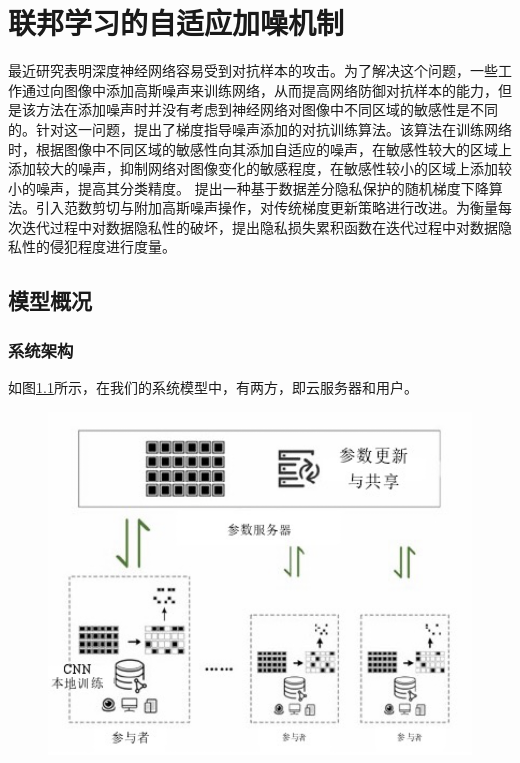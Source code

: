 \chapter{联邦学习的自适应加噪机制}
\label{ch3}

最近研究表明深度神经网络容易受到对抗样本的攻击。为了解决这个问题，一些工作通过向图像中添加高斯噪声来训练网络，从而提高网络防御对抗样本的能力，但是该方法在添加噪声时并没有考虑到神经网络对图像中不同区域的敏感性是不同的。针对这一问题，提出了梯度指导噪声添加的对抗训练算法。该算法在训练网络时，根据图像中不同区域的敏感性向其添加自适应的噪声，在敏感性较大的区域上添加较大的噪声，抑制网络对图像变化的敏感程度，在敏感性较小的区域上添加较小的噪声，提高其分类精度。
提出一种基于数据差分隐私保护的随机梯度下降算法。引入范数剪切与附加高斯噪声操作，对传统梯度更新策略进行改进。为衡量每次迭代过程中对数据隐私性的破坏，提出隐私损失累积函数在迭代过程中对数据隐私性的侵犯程度进行度量。

\section{模型概况}

\subsection{系统架构}
如图\ref{fig:联邦学习的系统架构}所示，在我们的系统模型中，有两方，即云服务器和用户。
\begin{figure}[!hbt]
\centering
	\includegraphics[scale=0.7]{fig2/C3/联邦学习系统架构}%
	\label{fig:联邦学习的系统架构}	
\end{figure}


